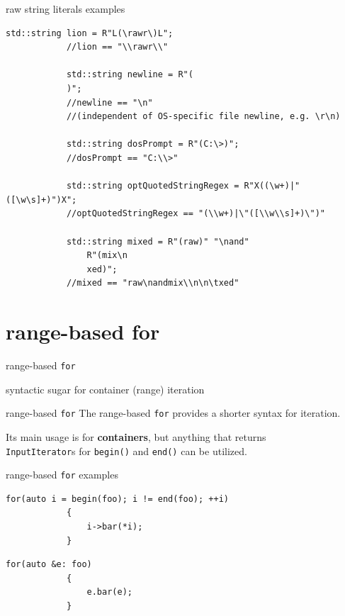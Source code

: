 	\begin{frame}[fragile=singleslide]{raw string literals examples}
		\begin{lstlisting}[gobble=12]
			std::string lion = R"L(\rawr\)L";
			//lion == "\\rawr\\"
			
			std::string newline = R"(
			)";
			//newline == "\n"
			//(independent of OS-specific file newline, e.g. \r\n)
			
			std::string dosPrompt = R"(C:\>)";
			//dosPrompt == "C:\\>"
			
			std::string optQuotedStringRegex = R"X((\w+)|"([\w\s]+)")X";
			//optQuotedStringRegex == "(\\w+)|\"([\\w\\s]+)\")"
			
			std::string mixed = R"(raw)" "\nand"
			    R"(mix\n
			    xed)";
			//mixed == "raw\nandmix\\n\n\txed"
		\end{lstlisting}
	\end{frame}
	
	\section{range-based \ttfamily for}
	\begin{frame}
		\begin{center}
			{\Huge range-based \lstinline[basicstyle=\Huge\ttfamily]|for|}
			
			\emptyline
			{\Large syntactic sugar for container (range) iteration}
		\end{center}
	\end{frame}
	
	\begin{frame}{range-based \lstinline|for|}
		The range-based \lstinline|for| provides a shorter syntax for iteration.
		
		Its main usage is for \textbf{containers}, but anything that returns \\
		\lstinline|InputIterator|s for \lstinline|begin()| and \lstinline|end()| can be utilized.
	\end{frame}
	
	\begin{frame}[fragile]{range-based \lstinline|for| examples}
		\begin{lstlisting}[title=traditional \lstinline|for|]
			for(auto i = begin(foo); i != end(foo); ++i)
			{
			    i->bar(*i);
			}
		\end{lstlisting}
		
		\pause
		
		\begin{lstlisting}[title=range-based \lstinline|for|]
			for(auto &e: foo)
			{
			    e.bar(e);
			}
		\end{lstlisting}
	\end{frame}
	
